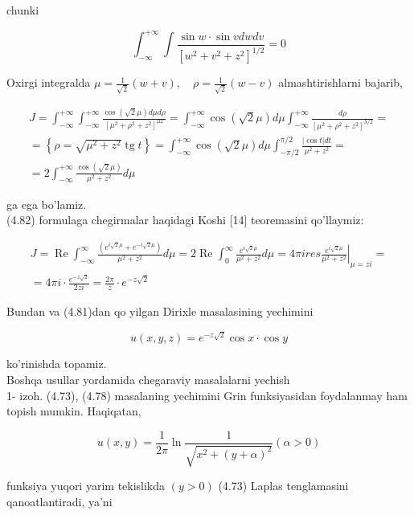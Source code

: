\documentclass[10pt]{article}
\begin{document}
chunki

$$
\int_{-\infty}^{+\infty} \int \frac{\sin w \cdot \sin v d w d v}{\left[w^{2}+v^{2}+z^{2}\right]^{1 / 2}}=0
$$

Oxirgi integralda $\mu=\frac{1}{\sqrt{2}}(w+v), \quad \rho=\frac{1}{\sqrt{2}}(w-v)$ almashtirishlarni bajarib,


\begin{gather*}
J=\int_{-\infty}^{+\infty} \int_{-\infty}^{+\infty} \frac{\cos (\sqrt{2} \mu) d \mu d \rho}{\left[\mu^{2}+\rho^{2}+z^{2}\right]^{\mu 2}}=\int_{-\infty}^{+\infty} \cos (\sqrt{2} \mu) d \mu \int_{-\infty}^{+\infty} \frac{d \rho}{\left[\mu^{2}+\rho^{2}+z^{2}\right]^{\lambda / 2}}= \\
=\left\{\rho=\sqrt{\mu^{2}+z^{2}} \operatorname{tg} t\right\}=\int_{-\infty}^{+\infty} \cos (\sqrt{2} \mu) d \mu \int_{-\pi / 2}^{\pi / 2} \frac{|\cos t| d t}{\mu^{2}+z^{2}}= \\
=2 \int_{-\infty}^{+\infty} \frac{\cos (\sqrt{2} \mu)}{\mu^{2}+z^{2}} d \mu \tag{4.82}
\end{gather*}


ga ega bo'lamiz.\\[0pt]
(4.82) formulaga chegirmalar haqidagi Koshi [14] teoremasini qo'llaymiz:

$$
\begin{gathered}
J=\operatorname{Re} \int_{-\infty}^{\infty} \frac{\left(e^{i \sqrt{2} \mu}+e^{-i \sqrt{2} \mu}\right)}{\mu^{2}+z^{2}} d \mu=2 \operatorname{Re} \int_{0}^{\infty} \frac{e^{i \sqrt{2} \mu}}{\mu^{2}+z^{2}} d \mu=\left.4 \pi i r e s \frac{e^{i \sqrt{2} \mu}}{\mu^{2}+z^{2}}\right|_{\mu=z i}= \\
=4 \pi i \cdot \frac{e^{-z \sqrt{2}}}{2 z i}=\frac{2 \pi}{z} \cdot e^{-z \sqrt{2}}
\end{gathered}
$$

Bundan va (4.81)dan qo yilgan Dirixle masalasining yechimini

$$
u(x, y, z)=e^{-z \sqrt{2}} \cos x \cdot \cos y
$$

ko'rinishda topamiz.\\
Boshqa usullar yordamida chegaraviy masalalarni yechish\\
1- izoh. (4.73), (4.78) masalaning yechimini Grin funksiyasidan foydalanmay ham topish mumkin. Haqiqatan,

$$
u(x, y)=\frac{1}{2 \pi} \ln \frac{1}{\sqrt{x^{2}+(y+\alpha)^{2}}}(\alpha>0)
$$

funksiya yuqori yarim tekislikda $(y>0)$ (4.73) Laplas tenglamasini qanoatlantiradi, ya'ni
\end{document}
